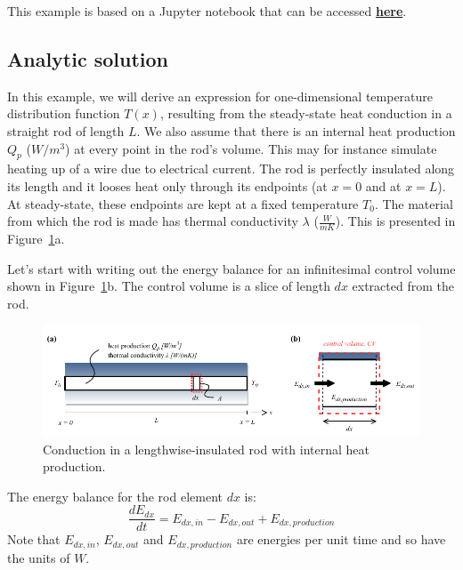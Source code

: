 This example is based on a Jupyter notebook that can be accessed \href{https://github.com/camillejr/fluid-dynamics-and-transport-phenomena/blob/master/transport-phenomena-with-Python/code/example-heat-transfer-in-a-rod.ipynb}{\textbf{here}}.

\subsection{Analytic solution}

In this example, we will derive an expression for one-dimensional temperature distribution function $T(x)$, resulting from the steady-state heat conduction in a straight rod of length $L$. We also assume that there is an internal heat production $Q_p$ ($W/m^3$) at every point in the rod's volume. This may for instance simulate heating up of a wire due to electrical current. The rod is perfectly insulated along its length and it looses heat only through its endpoints (at $x=0$ and at $x=L$). At steady-state, these endpoints are kept at a fixed temperature $T_0$. The material from which the rod is made has thermal conductivity $\lambda$ ($\frac{W}{mK}$). This is presented in Figure~\ref{fig:heat-transfer-in-a-rod-theory}a.

Let's start with writing out the energy balance for an infinitesimal control volume shown in Figure~\ref{fig:heat-transfer-in-a-rod-theory}b. The control volume is a slice of length $dx$ extracted from the rod.
\begin{figure}[H]
\centering\includegraphics[width=16cm]{figures/example-heat-transfer-in-a-rod-theory.pdf}
\caption{Conduction in a lengthwise-insulated rod with internal heat production.}
\label{fig:heat-transfer-in-a-rod-theory}
\end{figure}
The energy balance for the rod element $dx$ is:
\begin{equation}
\frac{dE_{dx}}{dt} = E_{dx, in} - E_{dx, out} + E_{dx, production}
\end{equation}
Note that $E_{dx, in}$, $E_{dx, out}$ and $E_{dx, production}$ are energies per unit time and so have the units of $W$.

